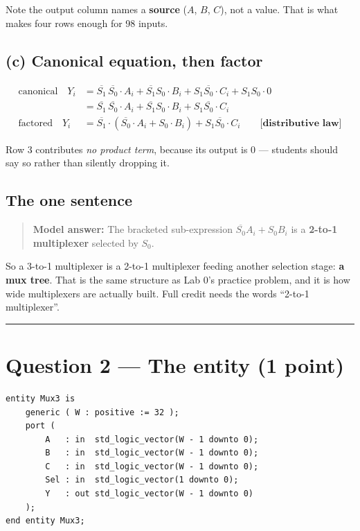 \documentclass[11pt]{article}
\newcommand{\hr}{\vspace{2pt}\hrule\vspace{6pt}}
\begin{document}
Note the output column names a \textbf{source} ($A$, $B$, $C$), not a value. That
is what makes four rows enough for 98 inputs.

\subsection*{(c) Canonical equation, then factor}

\begin{align*}
\text{canonical} \quad Y_i &= \overline{S_1}\,\overline{S_0}\cdot A_i
   + \overline{S_1}S_0\cdot B_i + S_1\overline{S_0}\cdot C_i + S_1 S_0 \cdot 0 \\
   &= \overline{S_1}\,\overline{S_0}\cdot A_i + \overline{S_1}S_0\cdot B_i + S_1\overline{S_0}\cdot C_i \\[4pt]
\text{factored} \quad Y_i &= \overline{S_1}\cdot\left( \overline{S_0}\cdot A_i + S_0\cdot B_i \right)
   + S_1\overline{S_0}\cdot C_i
   \qquad \textbf{[distributive law]}
\end{align*}

Row 3 contributes \emph{no product term}, because its output is 0 --- students
should say so rather than silently dropping it.

\subsection*{The one sentence}

\begin{quote}
\textbf{Model answer:} The bracketed sub-expression
$\overline{S_0}A_i + S_0 B_i$ is a \textbf{2-to-1 multiplexer} selected by $S_0$.
\end{quote}

So a 3-to-1 multiplexer is a 2-to-1 multiplexer feeding another selection stage:
\textbf{a mux tree}. That is the same structure as Lab 0's practice problem, and
it is how wide multiplexers are actually built. Full credit needs the words
``2-to-1 multiplexer''.

\vspace{4pt}\hr

\section*{Question 2 --- The entity (1 point)}

\begin{lstlisting}
entity Mux3 is
    generic ( W : positive := 32 );
    port (
        A   : in  std_logic_vector(W - 1 downto 0);
        B   : in  std_logic_vector(W - 1 downto 0);
        C   : in  std_logic_vector(W - 1 downto 0);
        Sel : in  std_logic_vector(1 downto 0);
        Y   : out std_logic_vector(W - 1 downto 0)
    );
end entity Mux3;
\end{lstlisting}
\end{document}
